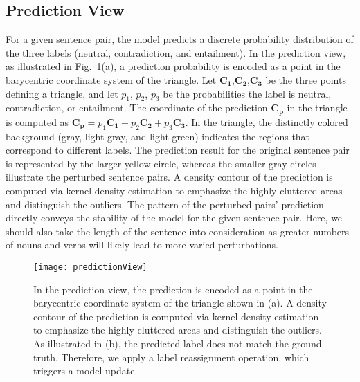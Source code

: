 
\subsection{Prediction View}
\label{sec:prediction}
For a given sentence pair, the model predicts a discrete probability distribution of the three labels (neutral, contradiction, and entailment).
%
In the prediction view, as illustrated in Fig.~\ref{fig:predictionView}(a), a prediction probability is encoded as a point in the barycentric coordinate system of the triangle.
Let $\mathbf{C_1}$,$\mathbf{C_2}$,$\mathbf{C_3}$ be the three points defining a triangle, and let $p_1$, $p_2$, $p_3$ be the probabilities the label is neutral, contradiction, or entailment. The coordinate of the prediction $\mathbf{C_p}$ in the triangle is computed as $\mathbf{C_p} = p_1\mathbf{C_1}+p_2\mathbf{C_2}+p_3\mathbf{C_3}$.
In the triangle, the distinctly colored background (gray, light gray, and light green) indicates the regions that correspond to different labels. The prediction result for the original sentence pair is represented by the larger yellow circle, whereas the smaller gray circles illustrate the perturbed sentence pairs. 
A density contour of the prediction is computed via kernel density estimation to emphasize the highly cluttered areas and distinguish the outliers.
The pattern of the perturbed pairs' prediction directly conveys the stability of the model for the given sentence pair. 
Here, we should also take the length of the sentence into consideration as greater numbers of nouns and verbs will likely lead to more varied perturbations.

\begin{figure}[htbp]
\centering
\vspace{-2mm}
 \texttt{[image: predictionView]}
 \vspace{-5mm}
 \caption{
In the prediction view, the prediction is encoded as a point in the barycentric coordinate system of the triangle shown in (a).
A density contour of the prediction is computed via kernel density estimation to emphasize the highly cluttered areas and distinguish the outliers.
As illustrated in (b), the predicted label does not match the ground truth. Therefore, we apply a label reassignment operation, which triggers a model update.
}
\vspace{-2mm}
\label{fig:predictionView}
\end{figure}

